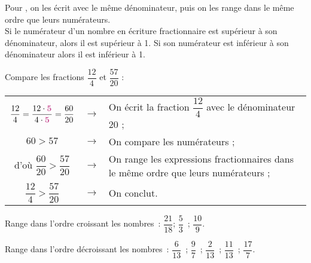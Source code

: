 
\begin{aconnaitre}
Pour , on les écrit avec le même dénominateur, puis on les range dans le même ordre que leurs numérateurs. \\[0.5em]
Si le numérateur d'un nombre en écriture fractionnaire est supérieur à son dénominateur, alors il est supérieur à 1. Si son numérateur est inférieur à son dénominateur alors il est inférieur à 1.
\end{aconnaitre}


\begin{methode*1}[Comparer]

\begin{exemple*1}
Compare les fractions $\dfrac{12}{4}$ et $\dfrac{57}{20}$ :
\begin{center}
 \begin{tabularx}{\linewidth}{ccX}
  $\dfrac{12}{4} = \dfrac{12 \cdot \text{\textbf{\textcolor{C2}{5}}}}{4 \cdot \text{\textbf{\textcolor{C2}{5}}}} = \dfrac{60}{20}$ & $\rightarrow$ & On écrit la fraction $\dfrac{12}{4}$ avec le dénominateur 20 ; \\
  $60 > 57$ & $\rightarrow$ & On compare les numérateurs ; \\[0.5em]
  d'où $\dfrac{60}{20} > \dfrac{57}{20}$ & $\rightarrow$ & On range les expressions fractionnaires dans le même ordre que leurs numérateurs ; \\ 
  $\dfrac{12}{4} > \dfrac{57}{20}$ & $\rightarrow$ & On conclut. \\
  \end{tabularx}
\end{center}
 \end{exemple*1}
 
  \exercice
Range dans l'ordre croissant les nombres : $\dfrac{21}{18}$; $\dfrac{5}{3}$ ; $\dfrac{10}{9}$.

  \exercice
Range dans l'ordre décroissant les nombres : $\dfrac{6}{13}$ ; $\dfrac{9}{7}$ ; $\dfrac{2}{13}$ ; $\dfrac{11}{13}$ ; $\dfrac{17}{7}$.

 \end{methode*1}


